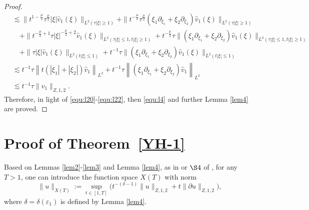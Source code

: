 \documentclass[11pt,twoside]{article}
\newcommand{\p}{\partial}
\newcommand{\f}{\frac}
\theoremstyle{plain}
\theoremstyle{definition}
\theoremstyle{remark}
\numberwithin{equation}{section}
\begin{document}
\begin{proof}
\begin{equation}
\begin{aligned}
& \lesssim\big\|t^{1-\frac{\mu}{2}} \tau^{\frac{\mu}{2}}|\xi| \hat{v}_1(\xi)\big\|_{L^2(\tau|\xi| \geqslant 1)}
+\|t^{-\frac{\mu}{2}} \tau^{\frac{\mu}{2}}\left(\xi_1 \partial_{ \xi_1}+\xi_2 \partial_ {\xi_2}\right) \hat{v}_1\left(\xi\right)\|_{L^2(\tau|\xi| \geqslant 1)}\\
&\quad + \|t^{-\f{\mu}{2}+1}\tau|\xi|^{-\f{\mu}{2}+2}\hat{v}_1(\xi)\|_{L^2(\tau|\xi| \leq 1, t|\xi|\geq1)}+t^{-\f{\mu}{2}}\tau\|(\xi_1\p_{\xi_1}+\xi_2\p_{\xi_2})\hat{v}_1(\xi)\|_{L^2(\tau|\xi| \leq 1, t|\xi|\geq1)}\\
&\quad+
\|\tau|\xi|\hat{v}_1(\xi)\|_{L^2(t|\xi| \leq 1)}+t^{-1}\tau\|(\xi_1\p_{\xi_1}+\xi_2\p_{\xi_2})\hat{v}_1(\xi)\|_{L^2(t|\xi|\leq1)}\\
& \lesssim t^{-1} \tau \left\| t(|\xi_1|+|\xi_2|) \hat{v}_1\right\|_{L^2}+t^{-1}\tau\left\|\left(\xi_1 \partial_{ \xi_1}+\xi_2\partial_ {\xi_2}\right) \hat{v}_1\right\|_{L^2}\\
& \lesssim t^{-1}\tau\|v_1\|_{Z, 1, 2}.
\end{aligned}
\end{equation}
Therefore, in light of \eqref{equ:l20}-\eqref{equ:l22}, then \eqref{equ:l4} and further Lemma \ref{lem4} are proved.
\end{proof}

\section{Proof of Theorem~\ref{YH-1}}
Based on Lemmas \ref{lem2}-\ref{lem3} and Lemma \ref{lem4}, as in \cite{LX} or $\S 4$ of \cite{Rei1},
for any $T>1$, one can introduce the function space $X(T)$ with norm
\begin{equation}\label{L1}
\|u\|_{X(T)}:=\sup _{t \in[1, T]}\big(t^{-(\delta-1)}\|u\|_{Z, 1, 2}+t\|\p u\|_{Z, 1, 2}\big),
\end{equation}
where $\delta=\delta(\varepsilon_1)$ is defined by Lemma \ref{lem4}.
\end{document}
